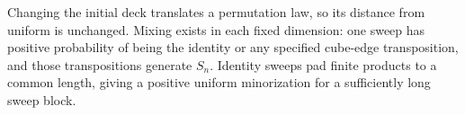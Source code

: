 Changing the initial deck translates a permutation law, so its distance from uniform is unchanged. Mixing exists in each fixed dimension: one sweep has positive probability of being the identity or any specified cube-edge transposition, and those transpositions generate $S_n$. Identity sweeps pad finite products to a common length, giving a positive uniform minorization for a sufficiently long sweep block.
